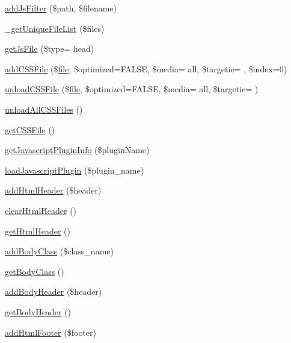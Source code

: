 \begin{DoxyCompactItemize}
\item 
\hyperlink{classContext_ae93f59a2ffac5a3074acd304d10ad7b3}{add\+Js\+Filter} (\$path, \$filename)
\item 
\hyperlink{classContext_a8bde0f7d77424555f9b856664b59e0bc}{\+\_\+get\+Unique\+File\+List} (\$files)
\item 
\hyperlink{classContext_aa3844fdfe0768191c5cef3aef8db1115}{get\+Js\+File} (\$type= \textquotesingle{}head\textquotesingle{})
\item 
\hyperlink{classContext_ac024e3744d631bf487ded23c2c6c7e24}{add\+C\+S\+S\+File} (\$\hyperlink{classfile}{file}, \$optimized=F\+A\+L\+S\+E, \$media= \textquotesingle{}all\textquotesingle{}, \$targetie= \textquotesingle{}\textquotesingle{}, \$index=0)
\item 
\hyperlink{classContext_aa8ef9bdf406752ca2f6a9746e239eb4e}{unload\+C\+S\+S\+File} (\$\hyperlink{classfile}{file}, \$optimized=F\+A\+L\+S\+E, \$media= \textquotesingle{}all\textquotesingle{}, \$targetie= \textquotesingle{}\textquotesingle{})
\item 
\hyperlink{classContext_a9eb05677aeb2e95029a10919ffc6053f}{unload\+All\+C\+S\+S\+Files} ()
\item 
\hyperlink{classContext_a1b14cb135e24cc9c79414a50575cf309}{get\+C\+S\+S\+File} ()
\item 
\hyperlink{classContext_abf616bb3259e090c6e85b3aa1b581b60}{get\+Javascript\+Plugin\+Info} (\$plugin\+Name)
\item 
\hyperlink{classContext_acaea76bdc1334df9c2f088103d619593}{load\+Javascript\+Plugin} (\$plugin\+\_\+name)
\item 
\hyperlink{classContext_a26a1aea944ae54bb826500f544a67950}{add\+Html\+Header} (\$header)
\item 
\hyperlink{classContext_a5f0332b30b4ad65c0374ebd848c1dd98}{clear\+Html\+Header} ()
\item 
\hyperlink{classContext_a302e4b5d868e7a5c8bee216f774ca244}{get\+Html\+Header} ()
\item 
\hyperlink{classContext_ad266c6556167746e9368c4b1a7f6b16b}{add\+Body\+Class} (\$class\+\_\+name)
\item 
\hyperlink{classContext_a6562a2a894b2142362640e512bcf4e09}{get\+Body\+Class} ()
\item 
\hyperlink{classContext_ae7c9dad9ccd3e410283e21c67f395114}{add\+Body\+Header} (\$header)
\item 
\hyperlink{classContext_a991c9fc6985b78d817b6771092913975}{get\+Body\+Header} ()
\item 
\hyperlink{classContext_aa81925b1cc7e991c1c798e739fe048a4}{add\+Html\+Footer} (\$footer)

\end{DoxyCompactItemize}
